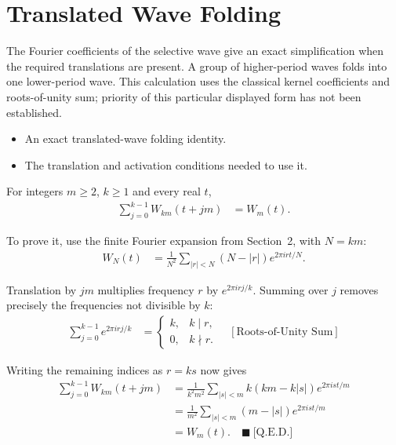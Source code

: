 \section{Translated Wave Folding}
The Fourier coefficients of the selective wave give an exact simplification
when the required translations are present. A group of higher-period waves
folds into one lower-period wave. This calculation uses the classical kernel
coefficients and roots-of-unity sum; priority of this particular displayed
form has not been established.

\begin{itemize}
\item An exact translated-wave folding identity.
\item The translation and activation conditions needed to use it.
\end{itemize}

For integers $m\ge2$, $k\ge1$ and every real $t$,
\begin{equation*}
\begin{aligned}
\sum_{j=0}^{k-1}W_{km}(t+jm)&=W_m(t).
\end{aligned}
\end{equation*}

To prove it, use the finite Fourier expansion from Section~2, with $N=km$:
\begin{equation*}
\begin{aligned}
W_N(t)&=\frac1{N^2}\sum_{|r| < N}(N-|r|)e^{2\pi i r t/N}.
\end{aligned}
\end{equation*}

Translation by $jm$ multiplies frequency $r$ by $e^{2\pi i rj/k}$.
Summing over $j$ removes precisely the frequencies not divisible by $k$:
\begin{equation*}
\begin{aligned}
\sum_{j=0}^{k-1}e^{2\pi i rj/k}
&=\begin{cases}k,&k\mid r,\\0,&k\nmid r.\end{cases}
\quad[\text{Roots-of-Unity Sum}]
\end{aligned}
\end{equation*}

Writing the remaining indices as $r=ks$ now gives
\begin{equation*}
\begin{aligned}
\sum_{j=0}^{k-1}W_{km}(t+jm)
&=\frac1{k^2m^2}\sum_{|s| < m}k(km-k|s|)e^{2\pi i s t/m}\\
&=\frac1{m^2}\sum_{|s| < m}(m-|s|)e^{2\pi i s t/m}\\
&=W_m(t).
\quad\blacksquare\ \text{[Q.E.D.]}
\end{aligned}
\end{equation*}

